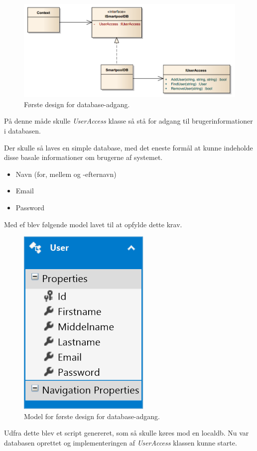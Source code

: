\begin{figure}[h]
	\centering
	\includegraphics[width=0.9\linewidth]{figs/design/database_class_1}
	\caption{Første design for database-adgang.}
	\label{fig:database_class_1}
\end{figure}

På denne måde skulle \textit{UserAccess} klasse så stå for adgang til brugerinformationer i databasen. 

Der skulle så laves en simple database, med det eneste formål at kunne indeholde disse basale informationer om brugerne af systemet.

\begin{itemize}
	\item Navn (for, mellem og -efternavn)
	\item Email
	\item Password
\end{itemize}

Med \gls{ef} blev følgende model lavet til at opfylde dette krav.

\begin{figure}[h]
	\centering
	\includegraphics[width=0.25\linewidth]{figs/design/database_model_1}
	\caption{Model for første design for database-adgang.}
	\label{fig:database_model_1}
\end{figure}

Udfra dette blev et script genereret, som så skulle køres mod en localdb. Nu var databasen oprettet og implementeringen af \textit{UserAccess} klassen kunne starte.

